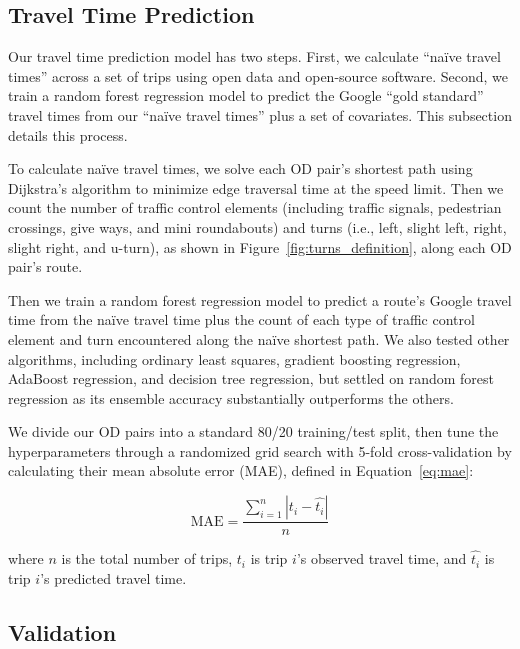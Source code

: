 \documentclass[12pt,letterpaper]{article} %
\begin{document}
    \subsection{Travel Time Prediction}

    Our travel time prediction model has two steps. First, we calculate \enquote{naïve travel times} across a set of trips using open data and open-source software. Second, we train a random forest regression model to predict the Google \enquote{gold standard} travel times from our \enquote{naïve travel times} plus a set of covariates. This subsection details this process.

    To calculate naïve travel times, we solve each OD pair's shortest path using Dijkstra's algorithm to minimize edge traversal time at the speed limit. Then we count the number of traffic control elements (including traffic signals, pedestrian crossings, give ways, and mini roundabouts) and turns (i.e., left, slight left, right, slight right, and u-turn), as shown in Figure~\ref{fig:turns_definition}, along each OD pair's route.

    Then we train a random forest regression model to predict a route's Google travel time from  the naïve travel time plus the count of each type of traffic control element and turn encountered along the naïve shortest path. We also tested other algorithms, including ordinary least squares, gradient boosting regression, AdaBoost regression, and decision tree regression, but settled on random forest regression as its ensemble accuracy substantially outperforms the others.

    We divide our OD pairs into a standard 80/20 training/test split, then tune the hyperparameters through a randomized grid search with 5-fold cross-validation by calculating their mean absolute error (MAE), defined in Equation~\ref{eq:mae}:

    \begin{equation}
        \label{eq:mae}
        \text{MAE} = \frac{\sum^{n}_{i=1} \left|{t_i - \hat{t_i}}\right|}{n}
    \end{equation}

    where $n$ is the total number of trips, $t_i$ is trip $i$'s observed travel time, and $\hat{t_i}$ is trip $i$'s predicted travel time.

    \subsection{Validation}
\end{document}
